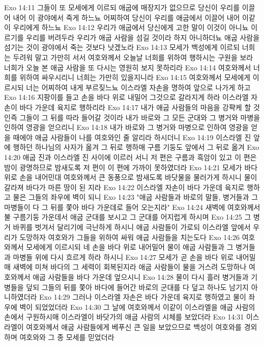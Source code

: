 Exo 14:11  그들이 또 모세에게 이르되 애굽에 매장지가 없으므로 당신이 우리를 이끌어 내어 이 광야에서 죽게 하느뇨 어찌하여 당신이 우리를 애굽에서 이끌어 내어 이같이 우리에게 하느뇨
Exo 14:12  우리가 애굽에서 당신에게 고한 말이 이것이 아니뇨 이르기를 우리를 버려두라 우리가 애굽 사람을 섬길 것이라 하지 아니하더뇨 애굽 사람을 섬기는 것이 광야에서 죽는 것보다 낫겠노라
Exo 14:13  모세가 백성에게 이르되 너희는 두려워 말고 가만히 서서 여호와께서 오늘날 너희를 위하여 행하시는 구원을 보라 너희가 오늘 본 애굽 사람을 또 다시는 영원히 보지 못하리라
Exo 14:14  여호와께서 너희를 위하여 싸우시리니 너희는 가만히 있을지니라
Exo 14:15  여호와께서 모세에게 이르시되 너는 어찌하여 내게 부르짖느뇨 이스라엘 자손을 명하여 앞으로 나가게 하고
Exo 14:16  지팡이를 들고 손을 바다 위로 내밀어 그것으로 갈라지게 하라 이스라엘 자손이 바다 가운데 육지로 행하리라
Exo 14:17  내가 애굽 사람들의 마음을 강퍅케 할 것인즉 그들이 그 뒤를 따라 들어갈 것이라 내가 바로와 그 모든 군대와 그 병거와 마병을 인하여 영광을 얻으리니
Exo 14:18  내가 바로와 그 병거와 마병으로 인하여 영광을 얻을 때에야 애굽 사람들이 나를 여호와인 줄 알리라 하시더니
Exo 14:19  이스라엘 진 앞에 행하던 하나님의 사자가 옮겨 그 뒤로 행하매 구름 기둥도 앞에서 그 뒤로 옮겨
Exo 14:20  애굽 진과 이스라엘 진 사이에 이르러 서니 저 편은 구름과 흑암이 있고 이 편은 밤이 광명하므로 밤새도록 저 편이 이 편에 가까이 못하였더라
Exo 14:21  모세가 바다 위로 손을 내어민대 여호와께서 큰 동풍으로 밤새도록 바닷물을 물러가게 하시니 물이 갈라져 바다가 마른 땅이 된 지라
Exo 14:22  이스라엘 자손이 바다 가운데 육지로 행하고 물은 그들의 좌우에 벽이 되니
Exo 14:23  "애굽 사람들과 바로의 말들, 병거들과 그 마병들이 다 그 뒤를 쫓아 바다 가운데로 들어 오는지라"
Exo 14:24  새벽에 여호와께서 불 구름기둥 가운데서 애굽 군대를 보시고 그 군대를 어지럽게 하시며
Exo 14:25  그 병거 바퀴를 벗겨서 달리기에 극난하게 하시니 애굽 사람들이 가로되 이스라엘 앞에서 우리가 도망하자 여호와가 그들을 위하여 싸워 애굽 사람들을 치는도다
Exo 14:26  여호와께서 모세에게 이르시되 네 손을 바다 위로 내어밀어 물이 애굽 사람들과 그 병거들과 마병들 위에 다시 흐르게 하라 하시니
Exo 14:27  모세가 곧 손을 바다 위로 내어밀매 새벽에 미쳐 바다의 그 세력이 회복된지라 애굽 사람들이 물을 거스려 도망하나 여호와께서 애굽 사람들을 바다 가운데 엎으시니
Exo 14:28  물이 다시 흘러 병거들과 기병들을 덮되 그들의 뒤를 쫓아 바다에 들어간 바로의 군대를 다 덮고 하나도 남기지 아니하였더라
Exo 14:29  그러나 이스라엘 자손은 바다 가운데 육지로 행하였고 물이 좌우에 벽이 되었었더라
Exo 14:30  그 날에 여호와께서 이같이 이스라엘을 애굽 사람의 손에서 구원하시매 이스라엘이 바닷가의 애굽 사람의 시체를 보았더라
Exo 14:31  이스라엘이 여호와께서 애굽 사람들에게 베푸신 큰 일을 보았으므로 백성이 여호와를 경외하며 여호와와 그 종 모세를 믿었더라
